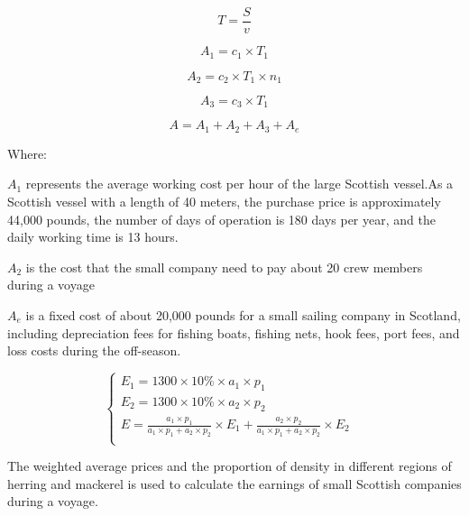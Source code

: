 \documentclass{mcmthesis}
\begin{document}
\begin{equation}\label{5}
T=\frac{S}{v}
\end{equation}


\begin{equation}\label{5}
A_1=c_1 \times T_1
\end{equation}

\begin{equation}\label{6}
A_2=c_2  \times T_1 \times n_1
\end{equation}

\begin{equation}\label{7}
A_3=c_3  \times T_1
\end{equation}

\begin{equation}\label{8}
A=A_1+A_2+A_3+A_e
\end{equation}

Where:

$A_1$ represents the average working cost per hour of the large Scottish vessel.As a Scottish vessel with a length of 40 meters, the purchase price is approximately 44,000 pounds, the number of days of operation is 180 days per year, and the daily working time is 13 hours.

$A_2$ is the cost that the small company need to pay about 20 crew members during a voyage

$A_e$ is a fixed cost of about 20,000 pounds for a small sailing company in Scotland, including depreciation fees for fishing boats, fishing nets, hook fees, port fees, and loss costs during the off-season.
 


\begin{equation}
\left\{
\begin{array}{lr}

E_1=1300 \times 10\% \times a_1 \times p_1 &\\
E_2=1300 \times 10\% \times a_2 \times p_2 &\\
E= \frac{a_1 \times p_1}{a_1 \times p_1+ a_2 \times p_2} \times E_1 + \frac{a_2 \times p_2}{a_1 \times p_1+ a_2 \times p_2} \times E_2\\

\end{array}
\right.
\end{equation}

The weighted average prices and the proportion of density in different regions of herring and mackerel  is used to calculate the earnings of small Scottish companies during a voyage. 
\end{document}
